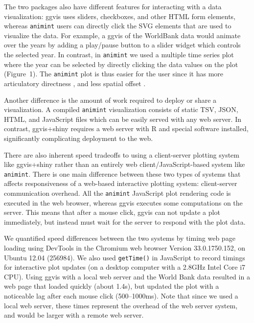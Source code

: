 \documentclass[journal]{vgtc}\usepackage[]{graphicx}\usepackage[]{color}
\begin{document}
The two packages also have different features for interacting with a
data visualization: ggvis uses sliders, checkboxes, and other HTML
form elements, whereas \texttt{animint} users can directly click the SVG
elements that are used to visualize the data. For example, a ggvis of
the WorldBank data would animate over the years by adding a play/pause
button to a slider widget which controls the selected year. In
contrast, in \texttt{animint} we used a multiple time series plot where the
year can be selected by directly clicking the data values on the plot
(Figure~1). The \texttt{animint} plot is thus easier for the user since it has
more articulatory directness \citep{Hutchins:1985}, and less spatial
offset \citep{instrumental-interaction}.

Another difference is the amount of work required to deploy or share a
visualization. A compiled \texttt{animint} visualization consists of static
TSV, JSON, HTML, and JavaScript files which can be easily served with
any web server. In contrast, ggvis+shiny requires a web server with R
and special software installed, significantly complicating
deployment to the web.

There are also inherent speed tradeoffs to using a client-server
plotting system like ggvis+shiny rather than an entirely web
client/JavaScript-based system like \texttt{animint}. There is one main
difference between these two types of systems that affects
responsiveness of a web-based interactive plotting system:
client-server communication overhead. All the \texttt{animint}
JavaScript plot rendering code is executed in the web browser, whereas
ggvis executes some computations on the server. This means that after
a mouse click, ggvis can not update a plot immediately, but instead
must wait for the server to respond with the plot data.

We quantified speed differences between the two systems by timing web
page loading using DevTools in the Chromium web browser Version
33.0.1750.152, on Ubuntu 12.04 (256984). We also used \texttt{getTime()}
in JavaScript to record timings for interactive plot updates (on a
desktop computer with a 2.8GHz Intel Core i7 CPU). Using ggvis with a
local web server and the World Bank data resulted in a web page that
loaded quickly (about 1.4s), but updated the plot with a noticeable
lag after each mouse click (500--1000ms). Note that since we used a
local web server, these times represent the overhead of the web server
system, and would be larger with a remote web server.
\end{document}

